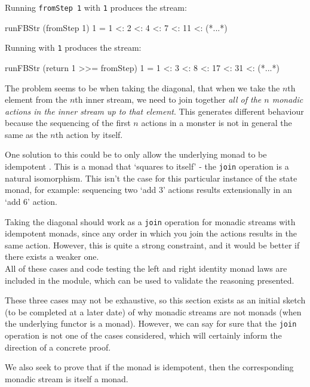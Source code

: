 Running \verb+fromStep 1+ with \verb+1+ produces the stream:
\begin{haskell}
runFBStr (fromStep 1) 1 = 1 <: 2 <: 4 <: 7 <: 11 <: (*...*)
\end{haskell}

Running  with \verb+1+ produces the stream:
\begin{haskell}
runFBStr (return 1 >>= fromStep) 1 = 1 <: 3 <: 8 <: 17 <: 31 <: (*...*)
\end{haskell}

The problem seems to be when taking the diagonal, that when we take the $n$th element from the $n$th inner stream, we need to join together {\em all of the $n$ monadic actions in the inner stream up to that element}. This generates different behaviour because the sequencing of the first $n$ actions in a monster is not in general the same as the $n$th action by itself.

One solution to this could be to only allow the underlying monad to be idempotent \cite{idempotent_monads}. This is a monad that `squares to itself' - the \verb+join+ operation is a natural isomorphism. This isn't the case for this particular instance of the state monad, for example: sequencing two `add 3' actions results extensionally in an `add 6' action.

Taking the diagonal should work as a \verb+join+ operation for monadic streams with idempotent monads, since any order in which you join the actions results in the same action. However, this is quite a strong constraint, and it would be better if there exists a weaker one. \\

All of these cases and code testing the left and right identity monad laws are included in the  module, which can be used to validate the reasoning presented.

These three cases may not be exhaustive, so this section exists as an initial sketch (to be completed at a later date) of why monadic streams are not monads (when the underlying functor is a monad). However, we can say for sure that the \verb+join+ operation is not one of the cases considered, which will certainly inform the direction of a concrete proof. 

We also seek to prove that if the monad is idempotent, then the corresponding monadic stream is itself a monad.

